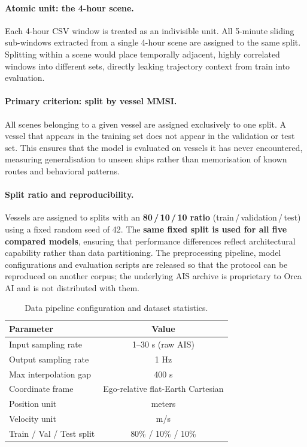 \documentclass[12pt, a4paper]{article}
\begin{document}
  \paragraph{Atomic unit: the 4-hour scene.}
  Each 4-hour CSV window is treated as an indivisible unit.  All 5-minute sliding
  sub-windows extracted from a single 4-hour scene are assigned to the same split.
  Splitting within a scene would place temporally adjacent, highly correlated windows
  into different sets, directly leaking trajectory context from train into evaluation.

  \paragraph{Primary criterion: split by vessel MMSI.}
  All scenes belonging to a given vessel are assigned exclusively to one split.
  A vessel that appears in the training set does not appear in the validation or test
  set.  This ensures that the model is evaluated on vessels it has never encountered,
  measuring generalisation to unseen ships rather than memorisation of known routes
  and behavioral patterns.

  \paragraph{Split ratio and reproducibility.}
  Vessels are assigned to splits with an \textbf{80\,/\,10\,/\,10 ratio}
  (train\,/\,validation\,/\,test) using a fixed random seed of 42.
  The \textbf{same fixed split is used for all five compared models}, ensuring that
  performance differences reflect architectural capability rather than data
  partitioning.  The preprocessing pipeline, model configurations and evaluation
  scripts are released so that the protocol can be reproduced on another corpus;
  the underlying AIS archive is proprietary to Orca AI and is not distributed
  with them.

  \begin{table}[H]
      \centering
      \caption{Data pipeline configuration and dataset statistics.}
      \label{tab:dataset}
      \begin{tabular}{lc}
          \toprule
          \textbf{Parameter} & \textbf{Value} \\
          \midrule
          Input sampling rate         & 1--30 s (raw AIS) \\
          Output sampling rate        & 1 Hz \\
          Max interpolation gap       & 400 s \\
          Coordinate frame            & Ego-relative flat-Earth Cartesian \\
          Position unit               & meters \\
          Velocity unit               & m/s \\
          Train / Val / Test split    & 80\% / 10\% / 10\% \\
          \bottomrule
      \end{tabular}
  \end{table}
\end{document}
